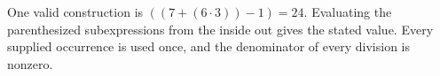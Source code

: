 One valid construction is $\boxed{((7+(6\cdot 3))-1)=24}$. Evaluating the parenthesized subexpressions from the inside out gives the stated value. Every supplied occurrence is used once, and the denominator of every division is nonzero.
